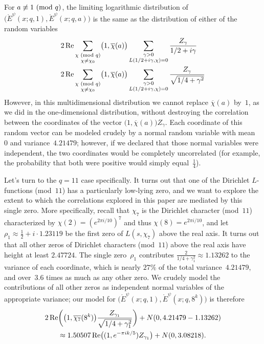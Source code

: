 \documentclass[11pt]{article}
\theoremstyle{plain}
\theoremstyle{definition}
\numberwithin{equation}{section}
\renewcommand{\mod}[1]{{\ifmmode\text{\rm\ (mod~$#1$)}\else\discretionary{}{}{\hbox{\!\!}}\rm(mod~$#1$)\fi}}
\renewcommand{\Re}{\mathop{\rm Re}}
\renewcommand{\bar}{\overline}
\newcommand{\Edot}{\mathord{\mathring E}}
\newcommand{\0}{{\vec 0}}
\begin{document}
For $a\not\equiv1\mod q$, the limiting logarithmic distribution of $\bigl( \Edot^\psi(x;q,1), \Edot^\psi(x;q,a) \bigr)$ is the same as the distribution of either of the random variables
\begin{align*}
& 2\Re \sum_{\substack{\chi\mod{q}\\\chi\neq \chi_0}} \bigl( 1, \bar{\chi}(a) \bigr) \sum_{\substack{\gamma>0 \\  L(1/2+i\gamma,\chi)=0}} \frac{Z_\gamma}{1/2+i\gamma} \\
& 2\Re \sum_{\substack{\chi\mod{q}\\\chi\neq \chi_0}} \bigl( 1, \bar{\chi}(a) \bigr) \sum_{\substack{\gamma>0 \\  L(1/2+i\gamma,\chi)=0}} \frac{Z_\gamma}{\sqrt{1/4+\gamma^2}}
\end{align*}
However, in this multidimensional distribution we cannot replace $\bar{\chi}(a)$ by~$1$, as we did in the one-dimensional distribution, without destroying the correlation between the coordinates of the vector $\bigl( 1, \bar{\chi}(a) \bigr) Z_\gamma$. Each coordinate of this random vector can be modeled crudely by a normal random variable with mean~$0$ and variance~$4.21479$; however, if we declared that those normal variables were independent, the two coordinates would be completely uncorrelated (for example, the probability that both were positive would simply equal~$\frac14$).

Let's turn to the $q=11$ case specifically. It turns out that one of the Dirichlet $L$-functions (mod~$11$) has a particularly low-lying zero, and we want to explore the extent to which the correlations explored in this paper are mediated by this single zero. More specifically, recall that $\chi_7$ is the Dirichlet character (mod~$11$) characterized by $\chi(2) = (e^{2\pi i/10})^7$ and thus $\chi(8) = e^{2\pi i/10}$, and let $\rho_1 \approx \frac12+i\cdot 1.23119$ be the first zero of $L(s,\chi_7)$ above the real axis. It turns out that all other zeros of Dirichlet characters (mod~$11$) above the real axis have height at least $2.47724$. The single zero~$\rho_1$ contributes $\frac2{1/4+\gamma_1^2} \approx 1.13262$ to the variance of each coordinate, which is nearly $27\%$ of the total variance~$4.21479$, and over~$3.6$ times as much as any other zero. We crudely model the contributions of all other zeros as independent normal variables of the appropriate variance; our model for $\bigl( \Edot^\psi(x;q,1), \Edot^\psi(x;q,8^k) \bigr)$ is therefore
\begin{multline} \label{one term and crude}
2\Re \biggl( \bigl( 1, \bar{\chi_7}(8^k) \bigr) \frac{Z_{\gamma_1}}{\sqrt{1/4+\gamma_1^2}} \biggr) + N(0,4.21479-1.13262) \\
\approx 1.50507\Re \bigl( (1, e^{-\pi i k/5}) Z_{\gamma_1} \bigr) + N(0,3.08218).
\end{multline}
\end{document}
